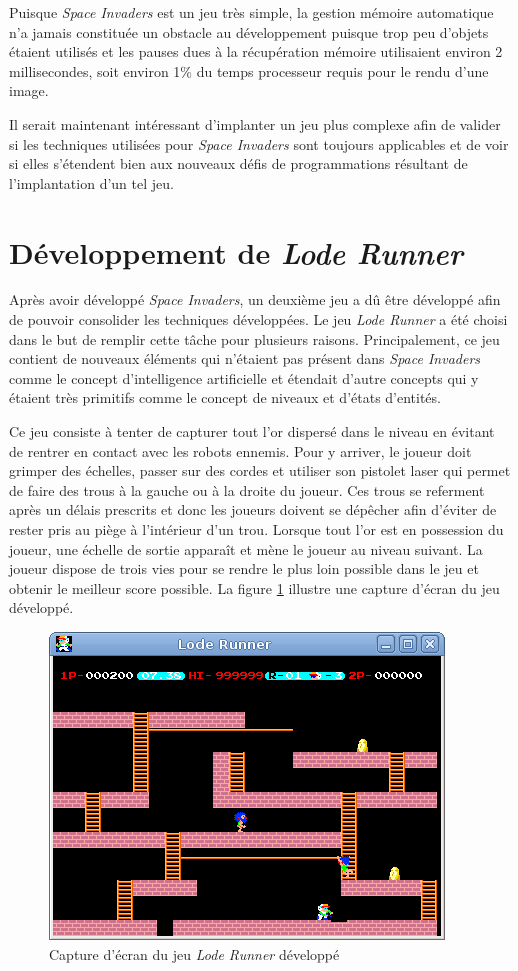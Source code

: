 \documentclass[12pt,oneside,letterpaper,francais]{book}
\newcommand{\lr}{{\textit{Lode Runner }}}
\newcommand{\si}{{\textit{Space Invaders }}}
\begin{document}
Puisque \si est un jeu très simple, la gestion mémoire automatique n'a
jamais constituée un obstacle au développement puisque trop peu
d'objets étaient utilisés et les pauses dues à la récupération mémoire
utilisaient environ 2 millisecondes, soit environ 1\% du temps
processeur requis pour le rendu d'une image.

Il serait maintenant intéressant d'implanter un jeu plus complexe afin
de valider si les techniques utilisées pour \si sont toujours
applicables et de voir si elles s'étendent bien aux nouveaux défis de
programmations résultant de l'implantation d'un tel jeu.



\section{Développement de \lr}
\label{Exp:ld}

Après avoir développé \textit{Space Invaders}, un deuxième jeu a dû
être développé afin de pouvoir consolider les techniques
développées. Le jeu \lr a été choisi dans le but de remplir cette
tâche pour plusieurs raisons. Principalement, ce jeu contient de
nouveaux éléments qui n'étaient pas présent dans \si comme le concept
d'intelligence artificielle et étendait d'autre concepts qui y étaient
très primitifs comme le concept de niveaux et d'états d'entités.

Ce jeu consiste à tenter de capturer tout l'or dispersé dans le niveau
en évitant de rentrer en contact avec les robots ennemis. Pour y
arriver, le joueur doit grimper des échelles, passer sur des cordes et
utiliser son pistolet laser qui permet de faire des trous à la gauche
ou à la droite du joueur. Ces trous se referment après un délais
prescrits et donc les joueurs doivent se dépêcher afin d'éviter de
rester pris au piège à l'intérieur d'un trou. Lorsque tout l'or est en
possession du joueur, une échelle de sortie apparaît et mène le joueur
au niveau suivant. La joueur dispose de trois vies pour se rendre le
plus loin possible dans le jeu et obtenir le meilleur score
possible. La figure \ref{Exp:ld-screen} illustre une capture d'écran
du jeu développé.

\begin{figure}[htb!]
  \center
  \includegraphics[scale=0.6]{lode-runner-screenshot}
  \caption{Capture d'écran du jeu \lr développé}
  \label{Exp:ld-screen}
\end{figure}
\end{document}
